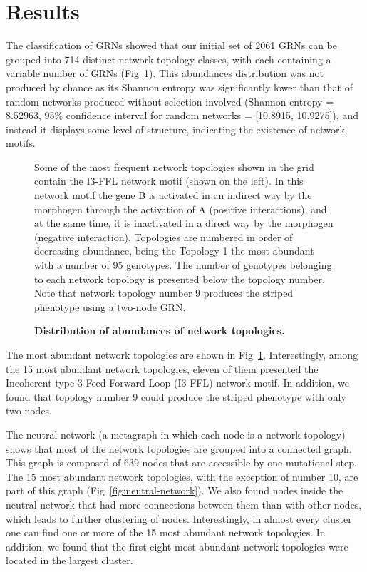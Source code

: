 \documentclass[10pt,letterpaper]{article}
\begin{document}
\section*{Results}

The classification of GRNs showed that our initial set of 2061 GRNs can be
grouped into 714 distinct network topology classes, with each containing a
variable number of GRNs (Fig~\ref{fig:distopol}). This abundances
distribution was not produced by chance as its Shannon entropy was
significantly lower than that of random networks produced without
selection involved (Shannon entropy = 8.52963, 95\%
confidence interval for random networks = [10.8915, 10.9275]), and
instead it displays some level of structure, indicating the existence
of network motifs.

\begin{figure}[!h]
 \caption{\bf Distribution of abundances of network topologies.}
 Some of the most frequent network topologies shown in the grid
 contain the I3-FFL network motif (shown on the left). In this network
 motif the gene B is activated in an indirect way by the morphogen through
 the activation of A (positive interactions), and at the same time, it
 is inactivated in a direct way by the morphogen (negative interaction).
 Topologies are numbered in order of decreasing abundance, being the
 Topology 1 the most abundant with a number of 95 genotypes. The number of
 genotypes belonging to each network topology is presented below the
 topology number.
 Note that network topology number 9 produces the striped phenotype using a
 two-node GRN.
 \label{fig:distopol}
\end{figure}

The most abundant network topologies are shown in Fig~\ref{fig:distopol}.
Interestingly, among the 15 most abundant network topologies, eleven of them
presented the Incoherent type 3 Feed-Forward Loop (I3-FFL) network motif. In
addition, we found that topology number 9 could produce the striped phenotype
with only two nodes.

The neutral network (a metagraph in which each node is a network topology)
shows that most of the network topologies are grouped into a connected graph.
This graph is composed of 639 nodes that are accessible by one mutational step.
The 15 most abundant network topologies, with the exception of
number 10, are part of this graph (Fig~\ref{fig:neutral-network}). We also
found nodes inside the neutral network that had more connections between them
than with other nodes, which leads to further clustering of nodes. Interestingly, in
almost every cluster one can find one or more of the 15 most abundant network
topologies. In addition, we found that the first eight most abundant network
topologies were located in the largest cluster.
\end{document}
